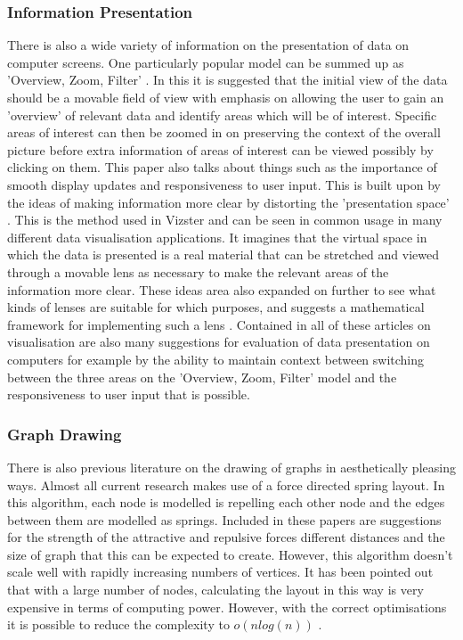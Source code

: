 \documentclass[12pt,a4paper]{article}
\begin{document}
\subsubsection{Information Presentation}
There is also a wide variety of information on the presentation of data on computer screens. One particularly popular model can be summed up as 'Overview, Zoom, Filter' \cite{shneiderman1996eyes}. In this it is suggested that the initial view of the data should be a movable field of view with emphasis on allowing the user to gain an 'overview' of relevant data and identify areas which will be of interest. Specific areas of interest can then be zoomed in on preserving the context of the overall picture before extra information of areas of interest can be viewed possibly by clicking on them. This paper also talks about things such as the importance of smooth display updates and responsiveness to user input. This is built upon by the ideas of making information more clear by distorting the 'presentation space' \cite{carpendale2001framework}. This is the method used in Vizster and can be seen in common usage in many different data visualisation applications. It imagines that the virtual space in which the data is presented is a real material that can be stretched and viewed through a movable lens as necessary to make the relevant areas of the information more clear. These ideas area also expanded on further to see what kinds of lenses are suitable for which purposes, and suggests a mathematical framework for implementing such a lens \cite{leung1994review}. Contained in all of these articles on visualisation are also many suggestions for evaluation of data presentation on computers for example by the ability to maintain context between switching between the three areas on the 'Overview, Zoom, Filter' model and the responsiveness to user input that is possible.

\subsubsection{Graph Drawing}
There is also previous literature on the drawing of graphs in aesthetically pleasing ways. Almost all current research makes use of a force directed spring layout. In this algorithm, each node is modelled is repelling each other node and the edges between them are modelled as springs\cite{fruchterman1991graph}. Included in these papers are suggestions for the strength of the attractive and repulsive forces different distances and the size of graph that this can be expected to create. However, this algorithm doesn't scale well with rapidly increasing numbers of vertices. It has been pointed out that with a large number of nodes, calculating the layout in this way is very expensive in terms of computing power. However, with the correct optimisations it is possible to reduce the complexity to $o(nlog(n))$ \cite{barnes1986hierarchical}.
\end{document}
